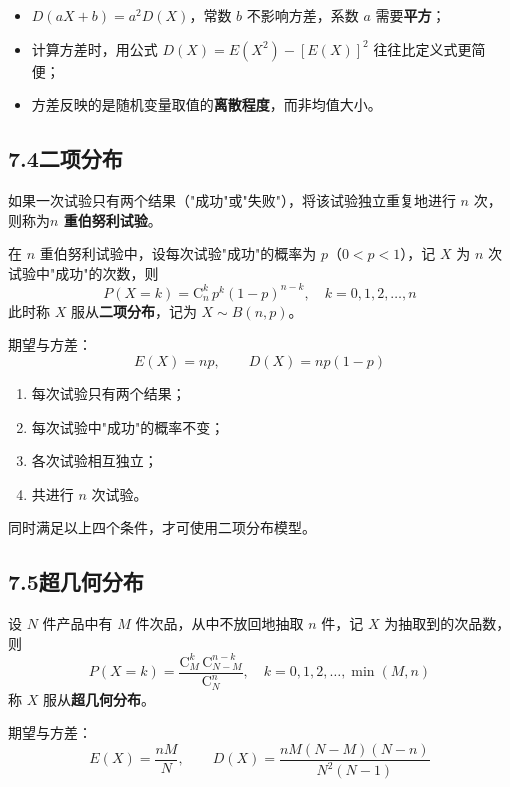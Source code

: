 \documentclass[12pt, a4paper]{ctexart}
\begin{document}
\begin{warnbox}[易错提醒]
\begin{itemize}
  \item $D(aX + b) = a^2 D(X)$，常数 $b$ 不影响方差，系数 $a$ 需要\textbf{平方}；
  \item 计算方差时，用公式 $D(X) = E(X^2) - [E(X)]^2$ 往往比定义式更简便；
  \item 方差反映的是随机变量取值的\textbf{离散程度}，而非均值大小。
\end{itemize}
\end{warnbox}

\subsection*{7.4\quad 二项分布}

\begin{knowledgebox}[伯努利试验与二项分布]
如果一次试验只有两个结果（"成功"或"失败"），将该试验独立重复地进行 $n$ 次，则称为\textbf{$n$ 重伯努利试验}。

在 $n$ 重伯努利试验中，设每次试验"成功"的概率为 $p$（$0 < p < 1$），记 $X$ 为 $n$ 次试验中"成功"的次数，则
\[
P(X = k) = \mathrm{C}_n^k \, p^k (1-p)^{n-k}, \quad k = 0, 1, 2, \ldots, n
\]
此时称 $X$ 服从\textbf{二项分布}，记为 $X \sim B(n, p)$。

\medskip
期望与方差：
\[
E(X) = np, \qquad D(X) = np(1-p)
\]
\end{knowledgebox}

\begin{tipbox}[二项分布的识别要点]
\begin{enumerate}[label=(\arabic*)]
  \item 每次试验只有两个结果；
  \item 每次试验中"成功"的概率不变；
  \item 各次试验相互独立；
  \item 共进行 $n$ 次试验。
\end{enumerate}
同时满足以上四个条件，才可使用二项分布模型。
\end{tipbox}

\subsection*{7.5\quad 超几何分布}

\begin{knowledgebox}[超几何分布]
设 $N$ 件产品中有 $M$ 件次品，从中不放回地抽取 $n$ 件，记 $X$ 为抽取到的次品数，则
\[
P(X = k) = \frac{\mathrm{C}_M^k \, \mathrm{C}_{N-M}^{n-k}}{\mathrm{C}_N^n}, \quad k = 0, 1, 2, \ldots, \min(M, n)
\]
称 $X$ 服从\textbf{超几何分布}。

\medskip
期望与方差：
\[
E(X) = \frac{nM}{N}, \qquad D(X) = \frac{nM(N-M)(N-n)}{N^2(N-1)}
\]
\end{knowledgebox}
\end{document}
